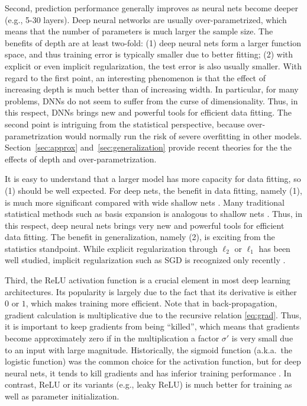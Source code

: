 Second, prediction performance generally improves as neural nets become deeper (e.g., 5-30 layers). Deep neural networks are usually over-parametrized, which means that the number of parameters is much larger the sample size. The benefits of depth are at least two-fold: (1) deep neural nets form a larger function space, and thus training error is typically smaller due to better fitting; (2) with explicit or even implicit regularization, the test error is also usually smaller. With regard to the first point, an interesting phenomenon is that the effect of increasing depth is much better than of increasing width. In particular, for many problems, DNNs do not seem to suffer from the curse of dimensionality. Thus, in this respect, DNNs brings new and powerful tools for efficient data fitting. The second point is intriguing from the statistical perspective, because over-parametrization would normally run the risk of severe overfitting in other models. Section~\ref{sec:approx} and~\ref{sec:generalization} provide recent theories for the the effects of depth and over-parametrization.

It is easy to understand that a larger model has more capacity for data fitting, so (1) should be well expected.  For deep nets, the benefit in data fitting, namely (1), is much more significant compared with wide shallow nets . Many traditional statistical methods such as basis expansion is analogous to shallow nets . Thus, in this respect, deep neural nets brings very new and powerful tools for efficient data fitting. The benefit in generalization, namely (2), is exciting from the statistics standpoint. While explicit regularization through $\ell_2$ or $\ell_1$ has been well studied, implicit regularization such as SGD is recognized only recently .


Third, the ReLU activation function is a crucial element in most deep learning architectures.  Its popularity is largely due to the fact that its derivative is either $0$ or $1$, which makes training more efficient. Note that in back-propagation, gradient calculation is multiplicative due to the recursive relation \eqref{eq:grad}. Thus, it is important to keep gradients from being ``killed'', which means that gradients become approximately zero if in the multiplication a factor $\sigma'$ is very small due to an input with large magnitude. Historically, the sigmoid function (a.k.a.\ the logistic function) was the common choice for the activation function, but for deep neural nets, it tends to kill gradients and has inferior training performance \citep{krizhevsky2012imagenet, maas2013rectifier}. In contrast, ReLU or its variants (e.g., leaky ReLU) is much better for training as well as parameter initialization.

